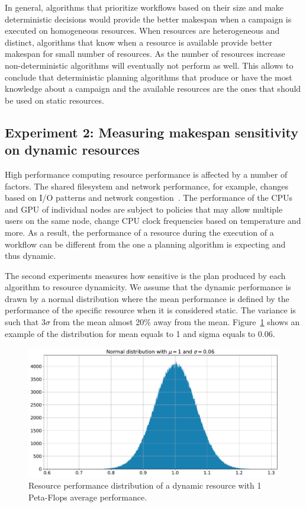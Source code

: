 In general, algorithms that prioritize workflows based on their size and make deterministic decisions would provide the better makespan when a campaign is executed on homogeneous resources.
When resources are heterogeneous and distinct, algorithms that know when a resource is available provide better makespan for small number of resources.
As the number of resources increase non-deterministic algorithms will eventually not perform as well.
This allows to conclude that deterministic planning algorithms that produce or have the most knowledge about a campaign and the available resources are the ones that should be used on static resources.


\subsection{Experiment 2: Measuring makespan sensitivity on dynamic resources}

High performance computing resource performance is affected by a number of factors.
The shared filesystem and network performance, for example, changes based on I/O patterns and network congestion~\cite{brown2018interference}.
The performance of the CPUs and GPU of individual nodes are subject to policies that may allow multiple users on the same node, change CPU clock frequencies based on temperature and more.
As a result, the performance of a resource during the execution of a workflow can be different from the one a planning algorithm is expecting and thus dynamic.

The second experiments measures how sensitive is the plan produced by each algorithm to resource dynamicity.
We assume that the dynamic performance is drawn by a normal distribution where the mean performance is defined by the performance of the specific resource when it is considered static.
The variance is such that $3\sigma$ from the mean almost 20\% away from the mean.
Figure~\ref{fig:dynamic_res} shows an example of the distribution for mean equals to 1 and sigma equals to 0.06.

\begin{figure}[ht!]
    \centering
    \includegraphics[width=.95\textwidth]{figures/campaign/DynRes.pdf}
    \caption{Resource performance distribution of a dynamic resource with 1 Peta-Flops average performance.}
    \label{fig:dynamic_res}
\end{figure}

